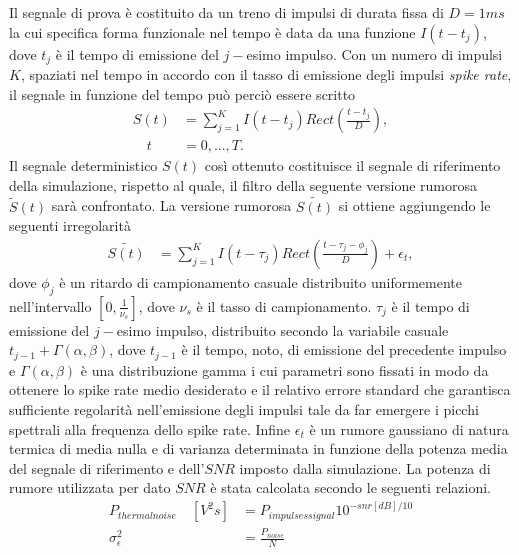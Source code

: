 \documentclass[9pt,twocolumn,twoside]{osajnl}
\begin{document}
Il segnale di prova è costituito da un treno di impulsi di durata fissa di $D=1ms$ la cui specifica forma funzionale nel tempo è data da una funzione $I(t-t_{j})$, dove $t_{j}$ è il tempo di emissione del $j-$esimo impulso. Con un numero di impulsi $K$, spaziati nel tempo in accordo con il tasso di emissione degli impulsi {\it spike rate}, il segnale in funzione del tempo può perciò essere scritto 
%
\begin{align*}
S(t) & = \sum_{j=1}^{K} I(t - t_{j})Rect(\frac{t-t_{j}}{D}),   \\
\quad t & = 0, ..., T.
\end{align*}
%
Il segnale deterministico $S(t)$ così ottenuto costituisce il segnale di riferimento della simulazione, rispetto al quale, il filtro della seguente versione rumorosa $\tilde{S}(t)$ sarà confrontato.
La versione rumorosa $\tilde{S(t)}$ si ottiene aggiungendo le seguenti irregolarità
%
\begin{align*}
\tilde{S(t)} & = \sum_{j=1}^{K} I(t - \tau_{j})Rect(\frac{t-\tau_{j}-\phi_{j}}{D}) 
 + \epsilon_{t},
 \end{align*}
%
dove $\phi_{j}$ è un ritardo di campionamento casuale distribuito uniformemente nell'intervallo $[0,\frac{1}{\nu_{s}}]$, dove $\nu_{s}$ è il tasso di campionamento. $\tau_{j}$ è il tempo di emissione del $j-$esimo impulso, distribuito secondo la variabile casuale $t_{j-1}+\Gamma(\alpha, \beta)$, dove $t_{j-1}$ è il tempo, noto, di emissione del precedente impulso e $\Gamma(\alpha, \beta)$ è una distribuzione gamma i cui parametri sono fissati in modo da ottenere lo spike rate medio desiderato e il relativo errore standard che garantisca sufficiente regolarità nell'emissione degli impulsi tale da far emergere i picchi spettrali alla frequenza dello spike rate.
%
%
Infine $\epsilon_{t}$ è un rumore gaussiano di natura termica di media nulla e di varianza determinata in funzione della potenza media del segnale di riferimento e dell'$SNR$ imposto dalla simulazione. La potenza di rumore utilizzata per dato $SNR$ è stata calcolata secondo le seguenti relazioni.
\begin{align*}
P_{thermal noise} \quad [V^2s] &=  P_{impulses signal} 10^{- snr [dB]/10} \\
\sigma^{2}_{\epsilon} &= \frac{ P_{noise} }{ N }
\end{align*}
\end{document}
